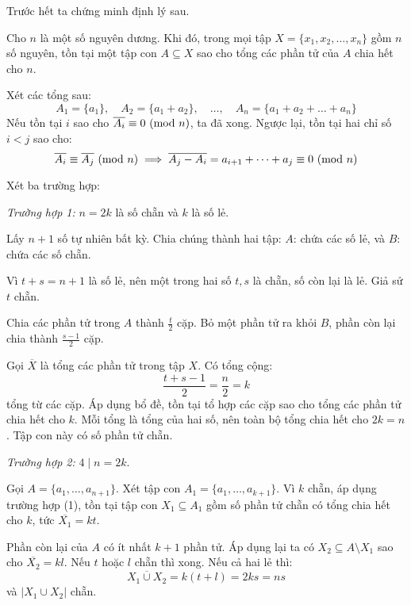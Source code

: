 \documentclass[../09-contruction-methods.tex]{subfiles}
\begin{document}
\begin{soln}\footnotemark
	Trước hết ta chứng minh định lý sau.
	\begin{theorem*}
		Cho \( n \) là một số nguyên dương. Khi đó, trong mọi tập \( X = \{x_1, x_2, \dots, x_n\} \) gồm \( n \) số nguyên,
		tồn tại một tập con \( A \subseteq X \) sao cho tổng các phần tử của \( A \) chia hết cho \( n \).
	\end{theorem*}
	\begin{subproof}
		Xét các tổng sau:
		\[
			A_1 = \{a_1\},\quad A_2 = \{a_1 + a_2\},\quad \dots,\quad A_n = \{a_1 + a_2 + \dots + a_n\}
		\]
		Nếu tồn tại \( i \) sao cho \( \overline{A_i} \equiv 0 \ (\mathrm{mod}\ n) \), ta đã xong. Ngược lại, tồn tại hai chỉ số \( i < j \) sao cho:
		\[
			\overline{A_i} \equiv \overline{A_j} \ (\mathrm{mod}\ n) \implies \overline{A_j - A_i} = a_{i+1} + \dots + a_j \equiv 0 \ (\mathrm{mod}\ n)
		\]
	\end{subproof}
	
	Xét ba trường hợp:

	\textit{Trường hợp 1:} \( n = 2k \) là số chẵn và \( k \) là số lẻ.

	Lấy \( n+1 \) số tự nhiên bất kỳ. Chia chúng thành hai tập: \( A \): chứa các số lẻ, và \( B \): chứa các số chẵn.

	Vì \( t + s = n + 1 \) là số lẻ, nên một trong hai số \( t, s \) là chẵn, số còn lại là lẻ. Giả sử \( t \) chẵn.

	Chia các phần tử trong \( A \) thành \( \frac{t}{2} \) cặp. Bỏ một phần tử ra khỏi \( B \), phần còn lại chia thành \( \frac{s - 1}{2} \) cặp.

	Gọi \( \overline{X} \) là tổng các phần tử trong tập \( X \). Có tổng cộng:
	\[
		\frac{t + s - 1}{2} = \frac{n}{2} = k
	\]
	tổng từ các cặp. Áp dụng bổ đề, tồn tại tổ hợp các cặp sao cho tổng các phần tử chia hết cho \( k \). Mỗi tổng là tổng của hai số, nên toàn bộ tổng chia hết cho \( 2k = n \). Tập con này có số phần tử chẵn.

	\textit{Trường hợp 2:} \( 4 \mid n = 2k \).

	Gọi \( A = \{a_1, \dots, a_{n+1}\} \). Xét tập con \( A_1 = \{a_1, \dots, a_{k+1}\} \). Vì \( k \) chẵn, áp dụng trường hợp (1), tồn tại tập con \( X_1 \subseteq A_1 \) gồm số phần tử chẵn có tổng chia hết cho \( k \), tức \( \overline{X_1} = kt \).

	Phần còn lại của \( A \) có ít nhất \( k + 1 \) phần tử. Áp dụng lại ta có \( X_2 \subseteq A \setminus X_1 \) sao cho \( \overline{X_2} = kl \). Nếu \( t \) hoặc \( l \) chẵn thì xong. Nếu cả hai lẻ thì:
	\[
		\overline{X_1 \cup X_2} = k(t + l) = 2ks = ns
	\]
	và \( |X_1 \cup X_2| \) chẵn.


\end{soln}
\end{document}
